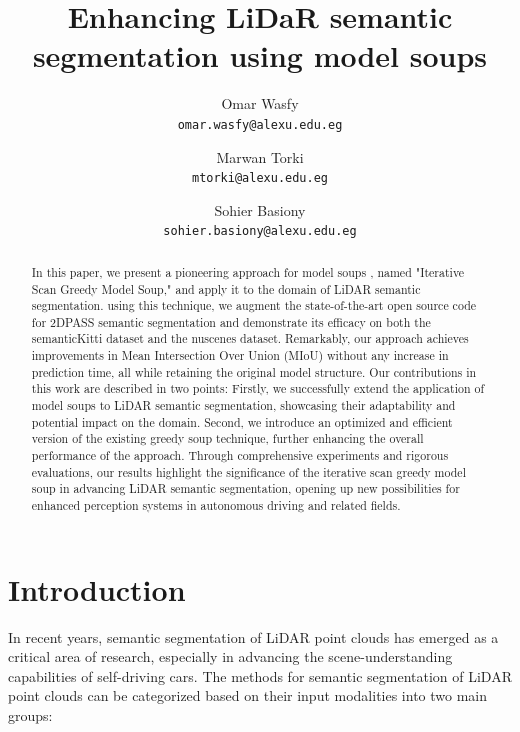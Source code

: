 \documentclass[10pt,twocolumn,letterpaper]{article}
\begin{document}
	
	\title{Enhancing LiDaR semantic segmentation using model soups }
	\author{ Omar Wasfy\\
	{\tt\small omar.wasfy@alexu.edu.eg}
\and
Marwan Torki\\
{\tt\small mtorki@alexu.edu.eg}
\and
Sohier Basiony\\
{\tt\small sohier.basiony@alexu.edu.eg}
}
\maketitle

\begin{abstract}
	In this paper, we present a pioneering approach for model soups \cite{wortsman2022model,dansereau2023model}, named "Iterative Scan Greedy Model Soup," and apply it to the domain of LiDAR semantic segmentation. using this technique, we augment the state-of-the-art open source code for 2DPASS \cite{yan20222dpass} semantic segmentation and demonstrate its efficacy on both the semanticKitti dataset and the nuscenes dataset. Remarkably, our approach achieves improvements in Mean Intersection Over Union (MIoU) without any increase in prediction time, all while retaining the original model structure.	Our contributions in this work are described in two points: Firstly, we successfully extend the application of model soups to LiDAR semantic segmentation, showcasing their adaptability and potential impact on the domain. Second, we introduce an optimized and efficient version of the existing greedy soup technique, further enhancing the overall performance of the approach. Through comprehensive experiments and rigorous evaluations, our results highlight the significance of the iterative scan greedy model soup in advancing LiDAR semantic segmentation, opening up new possibilities for enhanced perception systems in autonomous driving and related fields.
\end{abstract}

\section{Introduction}
\label{sec:intro}

In recent years, semantic segmentation of LiDAR point clouds has emerged as a critical area of research, especially in advancing the scene-understanding capabilities of self-driving cars.\cite{hu2019randla,yan2021sparse,SparseConv} The methods for semantic segmentation of LiDAR point clouds can be categorized based on their input modalities into two main groups:
\end{document}

